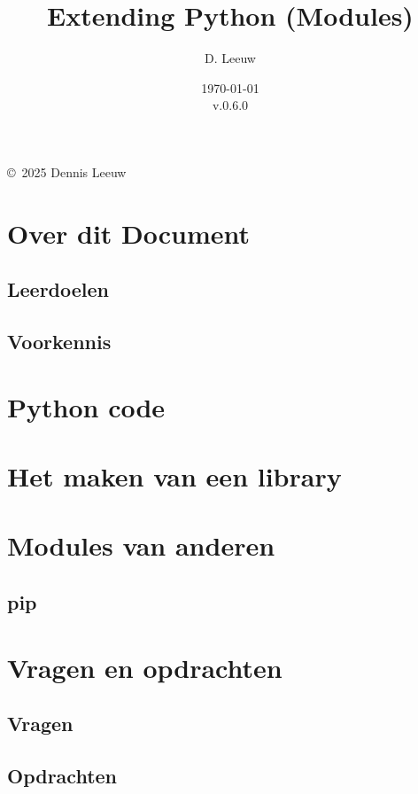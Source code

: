 \documentclass[a4paper,12pt,twoside,openright,titlepage]{article}
\author{D. Leeuw}
\title{Extending Python (Modules)}
\date{\today\\v.0.6.0}
\begin{document}

\maketitle

\copyright\ 2025 Dennis Leeuw\\




\section{Over dit Document}
\subsection{Leerdoelen}

\subsection{Voorkennis}




\section{Python code}


\section{Het maken van een library}


\section{Modules van anderen}

\subsection{pip}


\section{Vragen en opdrachten}
\subsection{Vragen}

\subsection{Opdrachten}


\printindex
\end{document}
